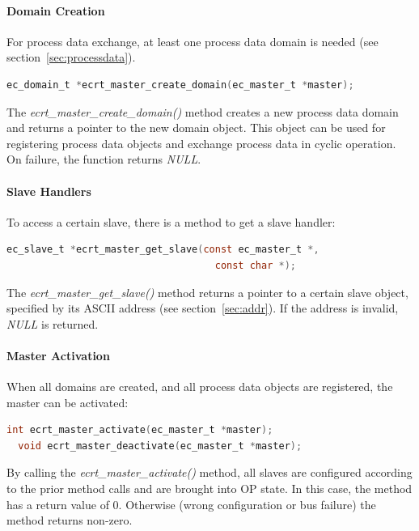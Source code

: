 \documentclass[a4paper,12pt,BCOR6mm,bibtotoc,idxtotoc]{scrbook}
\begin{document}
\paragraph{Domain Creation}

For process data exchange, at least one process data domain is needed
(see section~\ref{sec:processdata}).

\begin{lstlisting}[gobble=2,language=C]
  ec_domain_t *ecrt_master_create_domain(ec_master_t *master);
\end{lstlisting}

The \textit{ecrt\_master\_create\_domain()} method creates a new
process data domain and returns a pointer to the new domain object.
This object can be used for registering process data objects and
exchange process data in cyclic operation. On failure, the function
returns \textit{NULL}.

\paragraph{Slave Handlers}

To access a certain slave, there is a method to get a slave handler:

\begin{lstlisting}[gobble=2,language=C]
  ec_slave_t *ecrt_master_get_slave(const ec_master_t *,
                                    const char *);
\end{lstlisting}

The \textit{ecrt\_master\_get\_slave()} method returns a pointer to a
certain slave object, specified by its ASCII address (see
section~\ref{sec:addr}). If the address is invalid, \textit{NULL} is
returned.

\paragraph{Master Activation}

When all domains are created, and all process data objects are
registered, the master can be activated:

\begin{lstlisting}[gobble=2,language=C]
  int ecrt_master_activate(ec_master_t *master);
  void ecrt_master_deactivate(ec_master_t *master);
\end{lstlisting}

By calling the \textit{ecrt\_master\_activate()} method, all slaves
are configured according to the prior method calls and are brought
into OP state. In this case, the method has a return value of 0.
Otherwise (wrong configuration or bus failure) the method returns
non-zero.
\end{document}
